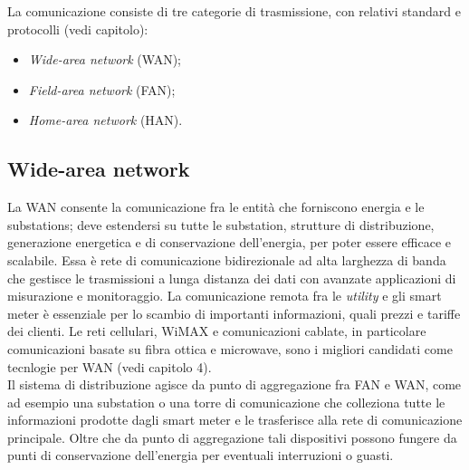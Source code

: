
La comunicazione consiste di tre categorie di trasmissione, con relativi standard e protocolli (vedi capitolo):
\begin{itemize}
	\item \emph{Wide-area network} (WAN);
	\item \emph{Field-area network} (FAN);
	\item \emph{Home-area network} (HAN).
\end{itemize}


\subsection{Wide-area network}
La WAN consente la comunicazione fra le entità che forniscono energia e le substations; deve estendersi su tutte le substation, strutture di distribuzione, generazione energetica e di conservazione dell'energia, per poter essere efficace e scalabile. Essa è rete di comunicazione bidirezionale ad alta larghezza di banda che gestisce le trasmissioni a lunga distanza dei dati con avanzate applicazioni di misurazione e monitoraggio. La comunicazione remota fra le \emph{utility} e gli smart meter è essenziale per lo scambio di importanti informazioni, quali prezzi e tariffe dei clienti. Le reti cellulari, WiMAX e comunicazioni cablate, in particolare comunicazioni basate su fibra ottica e microwave, sono i migliori candidati come tecnlogie per WAN (vedi capitolo 4).
\\
Il sistema di distribuzione agisce da punto di aggregazione fra FAN e WAN, come ad esempio una substation o una torre di comunicazione che colleziona tutte le informazioni prodotte dagli smart meter e le trasferisce alla rete di comunicazione principale. Oltre che da punto di aggregazione tali dispositivi possono fungere da punti di conservazione dell'energia per eventuali interruzioni o guasti.

